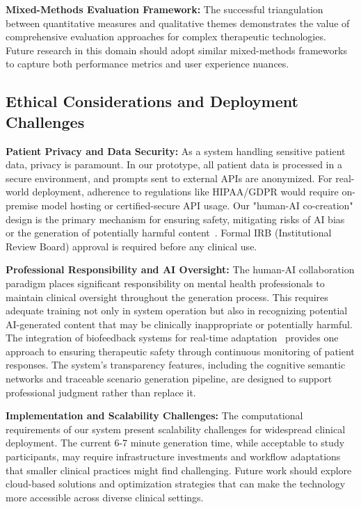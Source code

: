 \documentclass[]{interact}
\begin{document}
\textbf{Mixed-Methods Evaluation Framework:} The successful triangulation between quantitative measures and qualitative themes demonstrates the value of comprehensive evaluation approaches for complex therapeutic technologies. Future research in this domain should adopt similar mixed-methods frameworks to capture both performance metrics and user experience nuances.

\subsection{Ethical Considerations and Deployment Challenges}

\textbf{Patient Privacy and Data Security:} As a system handling sensitive patient data, privacy is paramount. In our prototype, all patient data is processed in a secure environment, and prompts sent to external APIs are anonymized. For real-world deployment, adherence to regulations like HIPAA/GDPR would require on-premise model hosting or certified-secure API usage. Our "human-AI co-creation" design is the primary mechanism for ensuring safety, mitigating risks of AI bias or the generation of potentially harmful content~\cite{fiske2019ethics}. Formal IRB (Institutional Review Board) approval is required before any clinical use.

\textbf{Professional Responsibility and AI Oversight:} The human-AI collaboration paradigm places significant responsibility on mental health professionals to maintain clinical oversight throughout the generation process. This requires adequate training not only in system operation but also in recognizing potential AI-generated content that may be clinically inappropriate or potentially harmful. The integration of biofeedback systems for real-time adaptation~\cite{zelis2025adaptive} provides one approach to ensuring therapeutic safety through continuous monitoring of patient responses. The system's transparency features, including the cognitive semantic networks and traceable scenario generation pipeline, are designed to support professional judgment rather than replace it.

\textbf{Implementation and Scalability Challenges:} The computational requirements of our system present scalability challenges for widespread clinical deployment. The current 6-7 minute generation time, while acceptable to study participants, may require infrastructure investments and workflow adaptations that smaller clinical practices might find challenging. Future work should explore cloud-based solutions and optimization strategies that can make the technology more accessible across diverse clinical settings.
\end{document}
